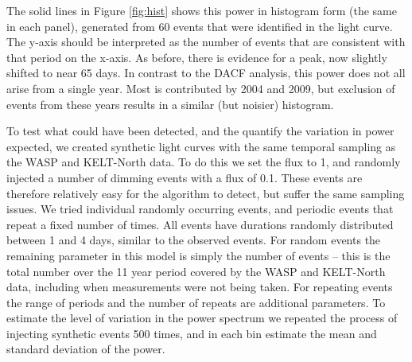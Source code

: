 \documentclass[]{rsos}
\begin{document}


The solid lines in Figure \ref{fig:hist} shows this power in histogram form (the same in
each panel), generated from 60 events that were identified in the light curve. The y-axis
should be interpreted as the number of events that are consistent with that period on the
x-axis. As before, there is evidence for a peak, now slightly shifted to near 65 days. In
contrast to the DACF analysis, this power does not all arise from a single year. Most is
contributed by 2004 and 2009, but exclusion of events from these years results in a
similar (but noisier) histogram.

To test what could have been detected, and the quantify the variation in power expected,
we created synthetic light curves with the same temporal sampling as the WASP and
KELT-North data. To do this we set the flux to 1, and randomly injected a number of
dimming events with a flux of 0.1. These events are therefore relatively easy for the
algorithm to detect, but suffer the same sampling issues. We tried individual randomly
occurring events, and periodic events that repeat a fixed number of times. All events
have durations randomly distributed between 1 and 4 days, similar to the observed
events. For random events the remaining parameter in this model is simply the number of
events -- this is the total number over the 11 year period covered by the WASP and
KELT-North data, including when measurements were not being taken. For repeating events
the range of periods and the number of repeats are additional parameters. To estimate the
level of variation in the power spectrum we repeated the process of injecting synthetic
events 500 times, and in each bin estimate the mean and standard deviation of the power.
\end{document}
